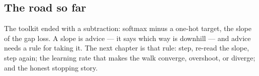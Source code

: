 \cleardoublepage
\begin{narrative}
\section*{The road so far}


\noindent The toolkit ended with a subtraction: softmax minus a one-hot target, the slope of the gap loss. A slope is advice — it says which way is downhill — and advice needs a rule for taking it. The next chapter is that rule: step, re-read the slope, step again; the learning rate that makes the walk converge, overshoot, or diverge; and the honest stopping story.
\end{narrative}
